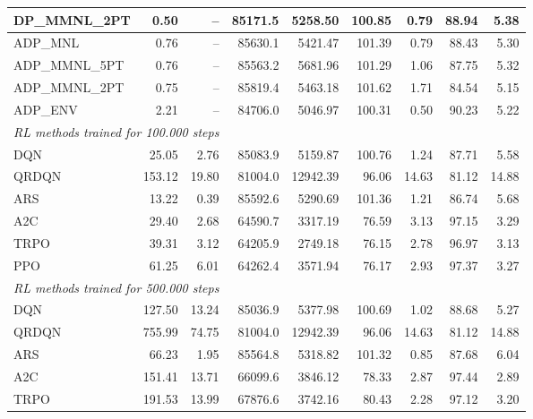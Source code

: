 \begin{samepage}
\begin{center}
\begin{tabular}{l|rr|rr|rr|rr}
    DP\_MMNL\_2PT &     0.50 &    -- &    85171.5 &    5258.50 &  100.85 &    0.79 &   88.94 &    5.38 \\
    \midrule
    ADP\_MNL     &     0.76 &    -- &    85630.1 &    5421.47 &  101.39 &    0.79 &   88.43 &    5.30 \\
    ADP\_MMNL\_5PT &     0.76 &    -- &    85563.2 &    5681.96 &  101.29 &    1.06 &   87.75 &    5.32 \\
    ADP\_MMNL\_2PT &     0.75 &    -- &    85819.4 &    5463.18 &  101.62 &    1.71 &   84.54 &    5.15 \\
    ADP\_ENV     &     2.21 &    -- &    84706.0 &    5046.97 &  100.31 &    0.50 &   90.23 &    5.22 \\
    \midrule
    \multicolumn{9}{l}{\textit{RL methods trained for 100.000 steps}} \\
    \midrule
    DQN          &    25.05 &     2.76 &    85083.9 &    5159.87 &  100.76 &    1.24 &   87.71 &    5.58 \\
    QRDQN        &   153.12 &    19.80 &    81004.0 &   12942.39 &   96.06 &   14.63 &   81.12 &   14.88 \\
    ARS          &    13.22 &     0.39 &    85592.6 &    5290.69 &  101.36 &    1.21 &   86.74 &    5.68 \\
    A2C          &    29.40 &     2.68 &    64590.7 &    3317.19 &   76.59 &    3.13 &   97.15 &    3.29 \\
    TRPO         &    39.31 &     3.12 &    64205.9 &    2749.18 &   76.15 &    2.78 &   96.97 &    3.13 \\
    PPO          &    61.25 &     6.01 &    64262.4 &    3571.94 &   76.17 &    2.93 &   97.37 &    3.27 \\
    \midrule
    \multicolumn{9}{l}{\textit{RL methods trained for 500.000 steps}} \\
    \midrule
    DQN          &   127.50 &    13.24 &    85036.9 &    5377.98 &  100.69 &    1.02 &   88.68 &    5.27 \\
    QRDQN        &   755.99 &    74.75 &    81004.0 &   12942.39 &   96.06 &   14.63 &   81.12 &   14.88 \\
    ARS          &    66.23 &     1.95 &    85564.8 &    5318.82 &  101.32 &    0.85 &   87.68 &    6.04 \\
    A2C          &   151.41 &    13.71 &    66099.6 &    3846.12 &   78.33 &    2.87 &   97.44 &    2.89 \\
    TRPO         &   191.53 &    13.99 &    67876.6 &    3742.16 &   80.43 &    2.28 &   97.12 &    3.20 \\

\end{tabular}
\end{center}
\end{samepage}
